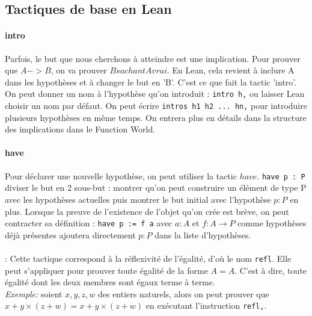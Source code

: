 \subsection{Tactiques de base en Lean}


\paragraph{intro}

Parfois, le but que nous cherchons à atteindre est une implication. Pour prouver que $A -> B$, on va prouver $B sachant A vrai$. En Lean, cela revient à inclure A dans les hypothèses et à changer le but en 'B'. C'est ce que fait la tactic 'intro'. On peut donner un nom à l'hypothèse qu'on introduit : \texttt{intro h,} ou laisser Lean choisir un nom par défaut.
On peut écrire \texttt{intros h1 h2 ... hn,} pour introduire plusieurs hypothèses en même temps.
On entrera plus en détails dans la structure des implications dans le Function World.

\paragraph{have}

Pour déclarer une nouvelle hypothèse, on peut utiliser la tactic $have$.
\texttt{have p : P} diviser le but en 2 sous-but : montrer qu'on peut construire un élément de type P avec les hypothèses actuelles puis montrer le but initial avec l'hypothèse $p : P$ en plus.
Lorsque la preuve de l'existence de l'objet qu'on crée est brève, on peut contracter sa définition :
\texttt{have p := f a} avec $a : A$ et $f : A \to P$ comme hypothèses déjà présentes ajoutera directement $p : P$ dans la liste d'hypothèses.  


\paragraph { }: Cette tactique correspond à la réflexivité de l'égalité, d'où le nom \texttt{refl}. Elle peut s'appliquer pour prouver toute égalité de la forme $A=A$. C'est à dire, toute égalité dont les deux membres sont égaux terme à terme. \\
\textit{Exemple:} soient $x,y,z,w$ des entiers naturels, alors on peut prouver que $x+y \times (z+w)=x+y \times (z+w)$ en exécutant l'instruction \texttt{refl,}.
